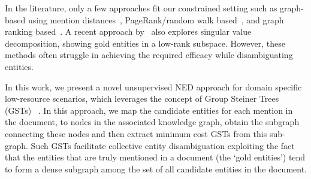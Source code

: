 \documentclass[11pt]{article}
\begin{document}



In the literature, only a few approaches fit our constrained setting such as graph-based using mention distances~\cite{hoffart2011robust}, PageRank/random walk based~\cite{guo2018robust}, and graph ranking based~\cite{alhelbawy2014graph}. A recent approach by~\cite{arora2021low} also explores singular value decomposition, showing gold entities in a low-rank subspace. However, these methods often struggle in achieving the required efficacy while disambiguating entities.



In this work, we present a novel unsupervised NED approach for domain specific low-resource 
scenarios, which leverages the concept of Group Steiner Trees (GSTs) ~\cite{garg2000polylogarithmic}.
In this approach, we map the candidate entities for each mention in the document, to nodes in the associated knowledge graph, obtain the subgraph connecting these nodes and then extract minimum cost GSTs from this sub-graph. Such GSTs facilitate collective entity disambiguation exploiting the
fact that the entities that are truly mentioned in
a document (the `gold entities') tend to form a
dense subgraph among the set of all candidate entities in the document.
\end{document}
